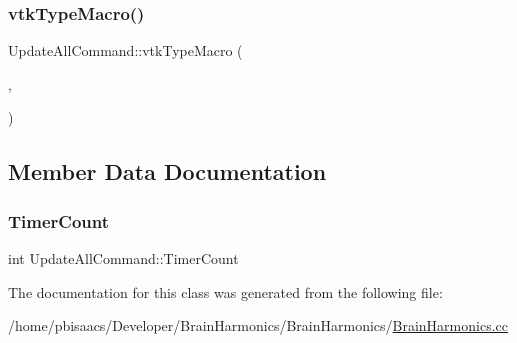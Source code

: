 \mbox{\label{classUpdateAllCommand_a228565b2a2306d425dc7eb3cda4d39a4}} 
\subsubsection{\texorpdfstring{vtk\+Type\+Macro()}{vtkTypeMacro()}}
{\footnotesize\ttfamily Update\+All\+Command\+::vtk\+Type\+Macro (\begin{DoxyParamCaption}\item[{\mbox{\hyperlink{classUpdateAllCommand}{Update\+All\+Command}}}]{,  }\item[{vtk\+Command}]{ }\end{DoxyParamCaption})}



\subsection{Member Data Documentation}
\mbox{\label{classUpdateAllCommand_a66ba9400072105306ca48a58470014dc}} 
\subsubsection{\texorpdfstring{Timer\+Count}{TimerCount}}
{\footnotesize\ttfamily int Update\+All\+Command\+::\+Timer\+Count\hspace{0.3cm}{\ttfamily [private]}}



The documentation for this class was generated from the following file\+:\begin{DoxyCompactItemize}
\item 
/home/pbisaacs/\+Developer/\+Brain\+Harmonics/\+Brain\+Harmonics/\mbox{\hyperlink{BrainHarmonics_8cc}{Brain\+Harmonics.\+cc}}\end{DoxyCompactItemize}
